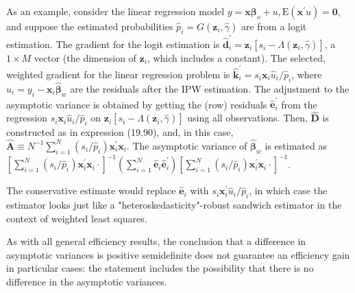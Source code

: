 \documentclass[10pt]{article}
\begin{document}
As an example, consider the linear regression model $y=\mathbf{x} \boldsymbol{\beta}_{o}+u, \mathrm{E}\left(\mathbf{x}^{\prime} u\right)=\mathbf{0}$, and suppose the estimated probabilities $\hat{p}_{i}=G\left(\mathbf{z}_{i}, \hat{\gamma}\right)$ are from a logit estimation. The gradient for the logit estimation is $\hat{\mathbf{d}}_{i}^{\prime}=\mathbf{z}_{i}\left[s_{i}-\Lambda\left(\mathbf{z}_{i}, \hat{\gamma}\right)\right]$, a $1 \times M$ vector (the dimension of $\mathbf{z}_{i}$, which includes a constant). The selected, weighted gradient for the linear regression problem is $\hat{\mathbf{k}}_{i}^{\prime}=s_{i} \mathbf{x}_{i} \hat{u}_{i} / \hat{p}_{i}$, where $\hat{u}_{i}=y_{i}-\mathbf{x}_{i} \hat{\boldsymbol{\beta}}_{w}$ are the residuals after the IPW estimation. The adjustment to the asymptotic variance is obtained by getting the (row) residuals $\hat{\mathbf{e}}_{i}^{\prime}$ from the regression $s_{i} \mathbf{x}_{i} \hat{u}_{i} / \hat{p}_{i}$ on $\mathbf{z}_{i}\left[s_{i}-\Lambda\left(\mathbf{z}_{i}, \hat{\gamma}\right)\right]$ using all observations. Then, $\hat{\mathbf{D}}$ is constructed as in expression (19.90), and, in this case, $\hat{\mathbf{A}} \equiv N^{-1} \sum_{i=1}^{N}\left(s_{i} / \hat{p}_{i}\right) \mathbf{x}_{i}^{\prime} \mathbf{x}_{i}$. The asymptotic variance of $\hat{\boldsymbol{\beta}}_{w}$ is estimated as\\
$\left[\sum_{i=1}^{N}\left(s_{i} / \hat{p}_{i}\right) \mathbf{x}_{i}^{\prime} \mathbf{x}_{i} \cdot\right]^{-1}\left(\sum_{i=1}^{N} \hat{\mathbf{e}}_{i} \hat{\mathbf{e}}_{i}^{\prime}\right)\left[\sum_{i=1}^{N}\left(s_{i} / \hat{p}_{i}\right) \mathbf{x}_{i}^{\prime} \mathbf{x}_{i} \cdot\right]^{-1}$.

The conservative estimate would replace $\hat{\mathbf{e}}_{i}$ with $s_{i} \mathbf{x}_{i}^{\prime} \hat{u}_{i} / \hat{p}_{i}$, in which case the estimator looks just like a "heteroskedasticity"-robust sandwich estimator in the context of weighted least squares.

As with all general efficiency results, the conclusion that a difference in asymptotic variances is positive semidefinite does not guarantee an efficiency gain in particular cases: the statement includes the possibility that there is no difference in the asymptotic variances.
\end{document}
